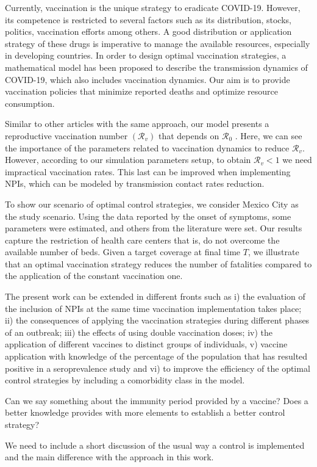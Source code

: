 \noindent Currently, vaccination is the unique strategy to eradicate COVID-19. However, its competence is restricted to several factors such as its distribution, stocks, politics, vaccination efforts among others.
 A good distribution or application strategy of these drugs is imperative to manage the available resources, especially in developing countries. In order to design optimal vaccination strategies, a mathematical model has been proposed to describe the transmission dynamics of COVID-19, which also includes vaccination dynamics. Our aim is to provide vaccination policies that minimize reported deaths and optimize resource consumption.
 
Similar to other articles with the same approach, our model presents a reproductive vaccination number $(\mathcal{R}_{v})$ that depends on $\mathcal{R}_{0}$ \cite{Alexander2004}. Here, we can see the importance of the parameters related to vaccination dynamics to reduce $\mathcal{R}_{v}$. However, according to our simulation parameters setup, to obtain $\mathcal{R}_{v} < 1$ we need impractical vaccination rates. This last can be improved when implementing NPIs, which can be modeled by transmission contact rates reduction.

To show our scenario of optimal control strategies, we consider Mexico City as the study scenario. Using the data reported by the onset of symptoms, some parameters were estimated, and others from the literature were set. Our results capture the restriction of health care centers that is, do not overcome the available number of beds. Given a target coverage at final time $T$, we illustrate that an optimal vaccination strategy reduces the number of fatalities compared to the application of the constant vaccination one. 

The present work can be extended in different fronts such as i) the evaluation of the inclusion of NPIs at the same time vaccination implementation takes place; ii) the consequences of applying the vaccination strategies during different phases of an outbreak; iii) the effects of using double vaccination doses; iv) the application of different vaccines to distinct groups of individuals, v) vaccine application with knowledge of the percentage of the population that has resulted positive in a seroprevalence study and vi) to improve the efficiency of the optimal control strategies by including a comorbidity class in the model.

Can we say something about the immunity period provided by a vaccine? Does a better knowledge provides with more elements to establish a better control strategy? 

We need to include a short discussion of the usual way a control is implemented and the main difference with the approach in this work.
